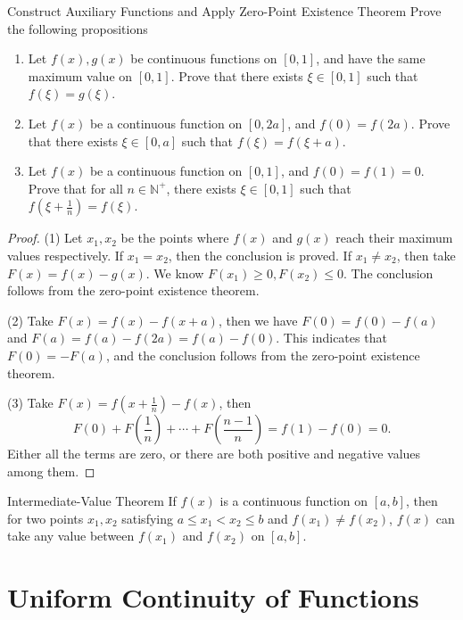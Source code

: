 \begin{example}{Construct Auxiliary Functions and Apply Zero-Point Existence Theorem}{}
  Prove the following propositions
  \begin{enumerate}
  \item Let $f(x), g(x)$ be continuous functions on $[0, 1]$,
    and have the same maximum value on $[0, 1]$.
    Prove that there exists $\xi \in [0, 1]$ such that $f(\xi) = g(\xi)$.
  \item Let $f(x)$ be a continuous function on $[0, 2a]$,
    and $f(0) = f(2a)$. Prove that there exists $\xi \in [0, a]$ such that
    $f(\xi) = f(\xi + a)$.
  \item Let $f(x)$ be a continuous function on $[0, 1]$,
    and $f(0) = f(1) = 0$. Prove that for all $n \in \mathbb{N}^+$,
    there exists $\xi \in [0, 1]$ such that $f(\xi + \frac{1}{n}) = f(\xi)$.
  \end{enumerate}
\end{example}

\begin{proof}
  (1) Let $x_1, x_2$ be the points where $f(x)$ and $g(x)$ reach their maximum
  values respectively. If $x_1 = x_2$, then the conclusion is proved.
  If $x_1 \neq x_2$, then take $F(x) = f(x) - g(x)$. We know $F(x_1) \geq 0,
  F(x_2) \leq 0$. The conclusion follows from the zero-point existence theorem.

  (2) Take $F(x) = f(x) - f(x+a)$, then we have $F(0) = f(0) - f(a)$ and $F(a) =
  f(a) - f(2a) = f(a) - f(0)$.
  This indicates that $F(0) = -F(a)$, and the conclusion follows from the
  zero-point existence theorem.

  (3) Take $F(x) = f(x + \frac{1}{n}) - f(x)$, then
  \begin{equation}
    F(0) + F(\frac{1}{n}) + \cdots + F(\frac{n-1}{n}) = f(1) - f(0) = 0.
  \end{equation}
  Either all the terms are zero, or there are both positive and negative values
  among them.
\end{proof}

\begin{theorem}{Intermediate-Value Theorem}{}
  If $f(x)$ is a continuous function on $[a, b]$,
  then for two points $x_1, x_2$ satisfying $a \leq x_1 < x_2 \leq b$ and
  $f(x_1) \neq f(x_2)$,
  $f(x)$ can take any value between $f(x_1)$ and $f(x_2)$ on $[a, b]$.
\end{theorem}


\section{Uniform Continuity of Functions}

